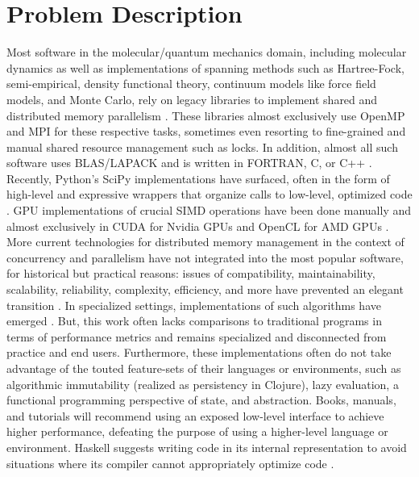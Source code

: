 \section{Problem Description}
Most software in the molecular/quantum mechanics domain, including molecular
dynamics as well as implementations of spanning methods such as Hartree-Fock,
semi-empirical, density functional theory, continuum models like force field
models, and Monte Carlo, rely on legacy libraries to implement shared and
distributed memory parallelism \cite{orca} \cite{lammps}
\cite{lammps_montecarlo}. These libraries almost exclusively use OpenMP and MPI
for these respective tasks, sometimes even resorting to fine-grained and manual
shared resource management such as locks. In addition, almost all such software
uses BLAS/LAPACK and is written in FORTRAN, C, or C++ \cite{lapack} \cite{eigen}. Recently,
Python's SciPy implementations have surfaced, often in the form of high-level
and expressive wrappers that organize calls to low-level, optimized code
\cite{scipy}. GPU implementations of crucial SIMD operations have been done
manually and almost exclusively in CUDA for Nvidia GPUs and OpenCL for AMD GPUs
\cite{gpu}. More current technologies for distributed memory management in the
context of concurrency and parallelism have not integrated into the most popular
software, for historical but practical reasons: issues of compatibility,
maintainability, scalability, reliability, complexity, efficiency, and more have
prevented an elegant transition \cite{kokkos_port}. In specialized settings,
implementations of such algorithms have emerged \cite{erlang_hpc}
\cite{clojure_hpc}. But, this work often lacks comparisons to traditional
programs in terms of performance metrics and remains specialized and
disconnected from practice and end users. Furthermore, these implementations
often do not take advantage of the touted feature-sets of their languages or
environments, such as algorithmic immutability (realized as persistency in
Clojure), lazy evaluation, a functional programming perspective of state, and
abstraction. Books, manuals, and tutorials will recommend using an exposed
low-level interface to achieve higher performance, defeating the purpose of
using a higher-level language or environment. Haskell suggests writing code in
its internal representation to avoid situations where its compiler cannot
appropriately optimize code \cite{haskell_opt}.

